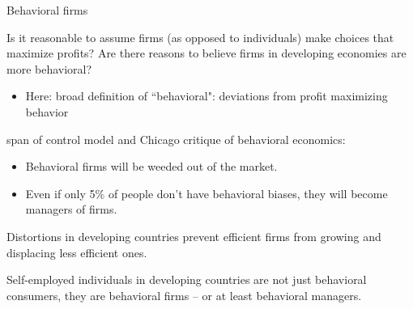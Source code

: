 \documentclass[aspectratio=169, 10pt, handout]{beamer}
\newenvironment{wideitemize}{\itemize\addtolength{\itemsep}{10pt}}{\enditemize}
\begin{document}
\begin{frame}{Behavioral firms}

\begin{wideitemize}

	\item Is it reasonable to assume firms (as opposed to individuals) make choices that maximize profits? Are there reasons to believe firms in developing economies are more behavioral?
	
	\begin{itemize}
	    
	    \item Here: broad definition of ``behavioral": deviations from profit maximizing behavior
	    
	\end{itemize}

	\item \cite{lucas1978size} span of control model and Chicago critique of behavioral economics:

	\begin{itemize}
	
		\item Behavioral firms will be weeded out of the market.
		
		\item Even if only 5\% of people don't have behavioral biases, they will become managers of firms.

	\end{itemize}
	
	\item Distortions in developing countries prevent efficient firms from growing and displacing less efficient ones.

	\item Self-employed individuals in developing countries are not just behavioral consumers, they are behavioral firms -- or at least behavioral managers. 

	
\end{wideitemize}

\end{frame}
\end{document}
